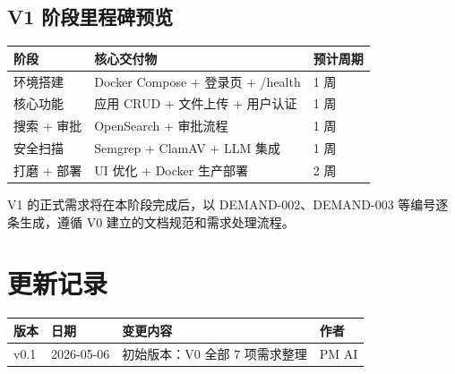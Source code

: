 \documentclass[11pt,a4paper]{article}
\begin{document}
\subsection{V1 阶段里程碑预览}

\begin{table}[h]
\centering
\begin{tabular}{lll}
\toprule
\textbf{阶段} & \textbf{核心交付物} & \textbf{预计周期} \\
\midrule
环境搭建 & Docker Compose + 登录页 + /health & 1 周 \\
核心功能 & 应用 CRUD + 文件上传 + 用户认证 & 1 周 \\
搜索 + 审批 & OpenSearch + 审批流程 & 1 周 \\
安全扫描 & Semgrep + ClamAV + LLM 集成 & 1 周 \\
打磨 + 部署 & UI 优化 + Docker 生产部署 & 2 周 \\
\bottomrule
\end{tabular}
\end{table}

V1 的正式需求将在本阶段完成后，以 DEMAND-002、DEMAND-003 等编号逐条生成，遵循 V0 建立的文档规范和需求处理流程。

\section*{更新记录}

\begin{tabular}{llll}
\toprule
版本 & 日期 & 变更内容 & 作者 \\
\midrule
v0.1 & 2026-05-06 & 初始版本：V0 全部 7 项需求整理 & PM AI \\
\bottomrule
\end{tabular}
\end{document}
